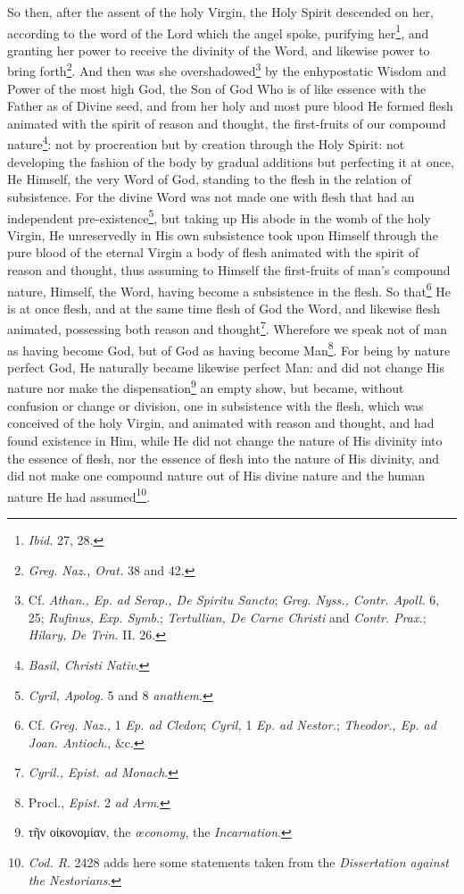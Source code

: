 So then, after the assent of the holy Virgin, the Holy Spirit descended on her, according to the word of the Lord which the angel spoke, purifying her\footnote{\emph{Ibid.} 27, 28.}, and granting her power to receive the divinity of the Word, and likewise power to bring forth\footnote{\emph{Greg. Naz., Orat. }38 and 42.}. And then was she overshadowed\footnote{Cf. \emph{Athan., Ep. ad Serap., De Spiritu Sancto}; \emph{Greg. Nyss., Contr. Apoll.} 6, 25; \emph{Rufinus, Exp. Symb}.; \emph{Tertullian, De Carne Christi} and \emph{Contr. Prax.}; \emph{Hilary, De Trin. }II. 26.} by the enhypostatic Wisdom and Power of the most high God, the Son of God Who is of like essence with the Father as of Divine seed, and from her holy and most pure blood He formed flesh animated with the spirit of reason and thought, the first-fruits of our compound nature\footnote{\emph{Basil, Christi Nativ}.}: not by procreation but by creation through the Holy Spirit: not developing the fashion of the body by gradual additions but perfecting it at once, He Himself, the very Word of God, standing to the flesh in the relation of subsistence. For the divine Word was not made one with flesh that had an independent pre-existence\footnote{\emph{Cyril, Apolog. }5 and 8 \emph{anathem}.}, but taking up His abode in the womb of the holy Virgin, He unreservedly in His own subsistence took upon Himself through the pure blood of the eternal Virgin a body of flesh animated with the spirit of reason and thought, thus assuming to Himself the first-fruits of man’s compound nature, Himself, the Word, having become a subsistence in the flesh. So that\footnote{Cf. \emph{Greg. Naz., }1 \emph{Ep. ad Cledon}; \emph{Cyril, }1 \emph{Ep. ad Nestor.}; \emph{Theodor., Ep. ad Joan. Antioch}., \&c.} He is at once flesh, and at the same time flesh of God the Word, and likewise flesh animated, possessing both reason and thought\footnote{\emph{Cyril., Epist. ad Monach}.}. Wherefore we speak not of man as having become God, but of God as having become Man\footnote{Procl., \emph{Epist. }2 \emph{ad Arm}.}. For being by nature perfect God, He naturally became likewise perfect Man: and did not change His nature nor make the dispensation\footnote{\textgreek{τῆν οἰκονομίαν}, the \emph{œconomy}, the \emph{Incarnation}.} an empty show, but became, without confusion or change or division, one in subsistence with the flesh, which was conceived of the holy Virgin, and animated with reason and thought, and had found existence in Him, while He did not change the nature of His divinity into the essence of flesh, nor the essence of flesh into the nature of His divinity, and did not make one compound nature out of His divine nature and the human nature He had assumed\footnote{\emph{Cod. R}. 2428 adds here some statements taken from the \emph{Dissertation against the Nestorians}.}.

